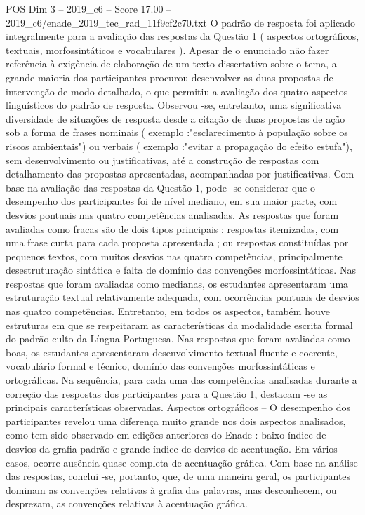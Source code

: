 \begin{textsample}{POS Dim 3 – 2019\_c6 – Score 17.00 – 2019\_c6/enade\_2019\_tec\_rad\_11f9cf2c70.txt}
O padrão de resposta foi aplicado integralmente para a avaliação das respostas da Questão 1 ( aspectos ortográficos, textuais, morfossintáticos e vocabulares ).
Apesar de o enunciado não fazer referência à exigência de elaboração de um texto dissertativo sobre o tema, a grande maioria dos participantes procurou desenvolver as duas propostas de intervenção de modo detalhado, o que permitiu a avaliação dos quatro aspectos linguísticos do padrão de resposta.
Observou -se, entretanto, uma significativa diversidade de situações de resposta desde a citação de duas propostas de ação sob a forma de frases nominais ( exemplo :"esclarecimento à população sobre os riscos ambientais") ou verbais ( exemplo :"evitar a propagação do efeito estufa"), sem desenvolvimento ou justificativas, até a construção de respostas com detalhamento das propostas apresentadas, acompanhadas por justificativas.
Com base na avaliação das respostas da Questão 1, pode -se considerar que o desempenho dos participantes foi de nível mediano, em sua maior parte, com desvios pontuais nas quatro competências analisadas.
As respostas que foram avaliadas como fracas são de dois tipos principais : respostas itemizadas, com uma frase curta para cada proposta apresentada ; ou respostas constituídas por pequenos textos, com muitos desvios nas quatro competências, principalmente desestruturação sintática e falta de domínio das convenções morfossintáticas.
Nas respostas que foram avaliadas como medianas, os estudantes apresentaram uma estruturação textual relativamente adequada, com ocorrências pontuais de desvios nas quatro competências.
Entretanto, em todos os aspectos, também houve estruturas em que se respeitaram as características da modalidade escrita formal do padrão culto da Língua Portuguesa.
Nas respostas que foram avaliadas como boas, os estudantes apresentaram desenvolvimento textual fluente e coerente, vocabulário formal e técnico, domínio das convenções morfossintáticas e ortográficas.
Na sequência, para cada uma das competências analisadas durante a correção das respostas dos participantes para a Questão 1, destacam -se as principais características observadas.
Aspectos ortográficos – O desempenho dos participantes revelou uma diferença muito grande nos dois aspectos analisados, como tem sido observado em edições anteriores do Enade : baixo índice de desvios da grafia padrão e grande índice de desvios de acentuação.
Em vários casos, ocorre ausência quase completa de acentuação gráfica.
Com base na análise das respostas, conclui -se, portanto, que, de uma maneira geral, os participantes dominam as convenções relativas à grafia das palavras, mas desconhecem, ou desprezam, as convenções relativas à acentuação gráfica.

\end{textsample}
